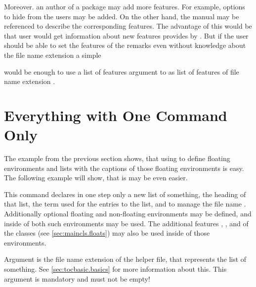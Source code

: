 Moreover. an author of a package may add more
features. For example, options to hide  from the users may be
added. On the other hand, the  manual may be referenced to
describe the corresponding features. The advantage of this would be that user
would get information about new features provides by . But
if the user should be able to set the features of the remarks even without
knowledge about the file name extension  a simple
\begin{lstcode}[belowskip=\dp\strutbox plus 1pt]
  \newcommand*{\setupremarkboxes}{\setuptoc{lor}}
\end{lstcode}
would be enough to use a list of features argument to
 as list of features of file name extension .

\section{Everything with One Command Only}
\label{sec:tocbasic.highlevel}

The example from the previous section shows, that using  to
define floating environments and lists with the captions of those floating
environments is easy. The following example will show, that is may be even
easier.

\begin{Declaration}
\end{Declaration}
%
This command
declares in one step only a new list of
something, the heading of that list, the term used for the entries to the
list, and to manage the file name . Additionally optional
floating and non-floating environments may be defined, and inside of both such
environments  may
be used. The additional features , , and 
of the \KOMAScript{} classes
(see \autoref{sec:maincls.floats})
may also be used inside of those environments.

Argument  is the file name extension of the helper file, that
represents the list of something. See \autoref{sec:tocbasic.basics} for more
information about this. This argument is mandatory and must not be empty!

